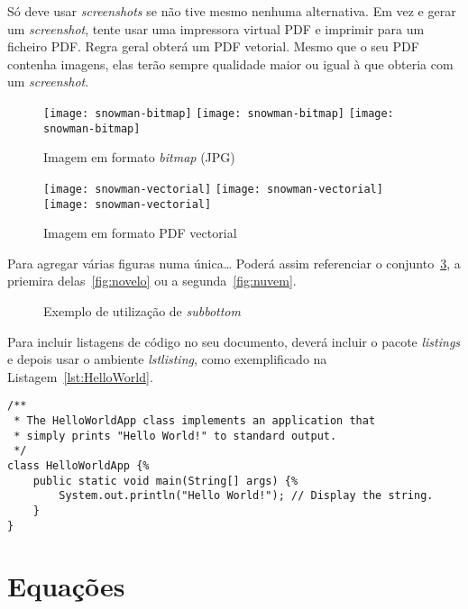 Só deve usar \emph{screenshots} se não tive mesmo nenhuma alternativa.  Em vez e gerar um \emph{screenshot}, tente usar uma impressora virtual PDF e imprimir para um ficheiro PDF. Regra geral obterá um PDF vetorial. Mesmo que o seu PDF contenha imagens, elas terão sempre qualidade maior ou igual à que obteria com um \emph{screenshot}.


\begin{figure}[htbp]
	\centering
	\texttt{[image: snowman-bitmap]}
	\texttt{[image: snowman-bitmap]}
	\texttt{[image: snowman-bitmap]}
	\caption{Imagem em formato \emph{bitmap} (JPG)}
	\label{fig:Figuras_Tree_silhouettes-bitmap}
\end{figure}

\begin{figure}[htbp]
	\centering
	\texttt{[image: snowman-vectorial]}
	\texttt{[image: snowman-vectorial]}
	\texttt{[image: snowman-vectorial]}
	\caption{Imagem em formato PDF vectorial}
	\label{fig:Figuras_Tree_silhouettes-vectorial}
\end{figure}

Para agregar várias figuras numa única… Poderá assim referenciar o conjunto~\ref{fig:figura-completa}, a priemira delas~\ref{fig:novelo} ou a segunda~\ref{fig:nuvem}.


\begin{figure}[htbp]
	\centering
\qquad\qquad
  \caption{Exemplo de utilização de \emph{subbottom}}
  \label{fig:figura-completa}
\end{figure}


Para incluir listagens de código no seu documento, deverá incluir o pacote \emph{listings} e depois usar o ambiente \emph{lstlisting}, como exemplificado na Listagem~\ref{lst:HelloWorld}.

\lstset{language=Java, caption=Hello World, label=lst:HelloWorld}
\begin{lstlisting}
/** 
 * The HelloWorldApp class implements an application that
 * simply prints "Hello World!" to standard output.
 */
class HelloWorldApp {%
    public static void main(String[] args) {%
        System.out.println("Hello World!"); // Display the string.
    }
}
\end{lstlisting}

\section{Equações}

